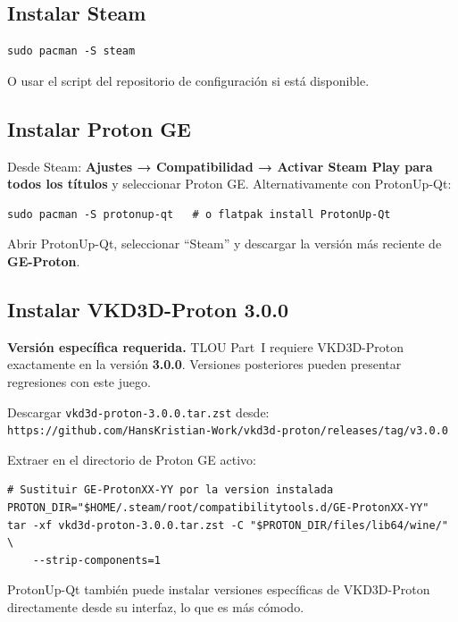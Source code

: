 \documentclass[12pt,a4paper]{article}
\begin{document}
\subsection{Instalar Steam}

\begin{lstlisting}[style=bash]
sudo pacman -S steam
\end{lstlisting}

O usar el script del repositorio de configuración si está disponible.

\subsection{Instalar Proton GE}

Desde Steam: \textbf{Ajustes → Compatibilidad → Activar Steam Play para
todos los títulos} y seleccionar Proton GE. Alternativamente con ProtonUp-Qt:

\begin{lstlisting}[style=bash]
sudo pacman -S protonup-qt   # o flatpak install ProtonUp-Qt
\end{lstlisting}

Abrir ProtonUp-Qt, seleccionar ``Steam'' y descargar la versión más reciente
de \textbf{GE-Proton}.

\subsection{Instalar VKD3D-Proton 3.0.0}

\begin{advertencia}
\textbf{Versión específica requerida.} TLOU Part~I requiere VKD3D-Proton
exactamente en la versión \textbf{3.0.0}. Versiones posteriores pueden
presentar regresiones con este juego.
\end{advertencia}

Descargar \texttt{vkd3d-proton-3.0.0.tar.zst} desde:
\texttt{https://github.com/HansKristian-Work/vkd3d-proton/releases/tag/v3.0.0}

Extraer en el directorio de Proton GE activo:

\begin{lstlisting}[style=bash]
# Sustituir GE-ProtonXX-YY por la version instalada
PROTON_DIR="$HOME/.steam/root/compatibilitytools.d/GE-ProtonXX-YY"
tar -xf vkd3d-proton-3.0.0.tar.zst -C "$PROTON_DIR/files/lib64/wine/" \
    --strip-components=1
\end{lstlisting}

\begin{nota}
ProtonUp-Qt también puede instalar versiones específicas de VKD3D-Proton
directamente desde su interfaz, lo que es más cómodo.
\end{nota}
\end{document}
